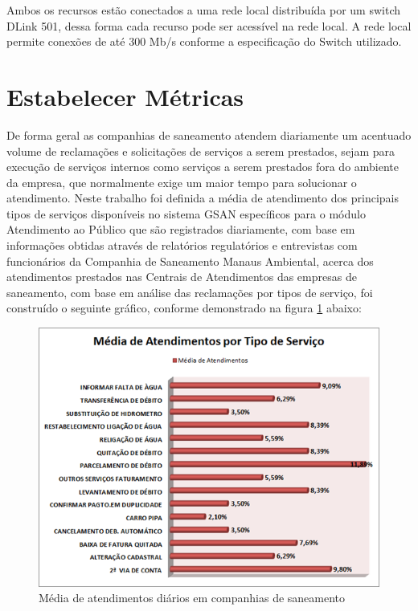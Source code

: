 Ambos os recursos estão conectados a uma rede local distribuída por um switch DLink 501, dessa forma cada recurso pode ser acessível na rede local. A rede local permite conexões de até 300 Mb/s conforme a especificação do Switch utilizado.


\section{Estabelecer Métricas}
De forma geral as companhias de saneamento atendem diariamente um acentuado volume de reclamações e solicitações de serviços a serem prestados, sejam para execução de serviços internos como serviços a serem prestados fora do ambiente da empresa, que normalmente exige um maior tempo para solucionar o atendimento.
Neste trabalho foi definida a média de atendimento dos principais tipos de serviços disponíveis no sistema GSAN específicos para o módulo Atendimento ao Público que são registrados diariamente, com base em informações obtidas através de relatórios regulatórios e entrevistas com funcionários da Companhia de Saneamento Manaus Ambiental, acerca dos atendimentos prestados nas Centrais de Atendimentos das empresas de saneamento, com base em análise das reclamações por tipos de serviço, foi construído o seguinte gráfico, conforme demonstrado na figura \ref{figura:mediaAtendimentos} abaixo:

\begin{figure}[!htb]
	\centering
	\includegraphics{figuras/media_atendimentos.png}
	\caption{Média de atendimentos diários em companhias de saneamento}	
	\label{figura:mediaAtendimentos}
\end{figure}

